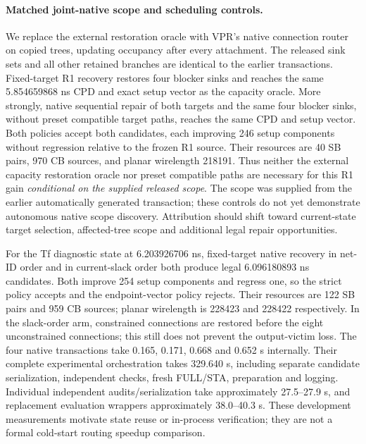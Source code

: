 \paragraph{Matched joint-native scope and scheduling controls.}
We replace the external restoration oracle with VPR's native connection router on copied trees, updating occupancy after every attachment. The released sink sets and all other retained branches are identical to the earlier transactions. Fixed-target R1 recovery restores four blocker sinks and reaches the same 5.854659868 ns CPD and exact setup vector as the capacity oracle. More strongly, native sequential repair of both targets and the same four blocker sinks, without preset compatible target paths, reaches the same CPD and setup vector. Both policies accept both candidates, each improving 246 setup components without regression relative to the frozen R1 source. Their resources are 40 SB pairs, 970 CB sources, and planar wirelength 218191. Thus neither the external capacity restoration oracle nor preset compatible paths are necessary for this R1 gain \emph{conditional on the supplied released scope}. The scope was supplied from the earlier automatically generated transaction; these controls do not yet demonstrate autonomous native scope discovery. Attribution should shift toward current-state target selection, affected-tree scope and additional legal repair opportunities.

For the Tf diagnostic state at 6.203926706 ns, fixed-target native recovery in net-ID order and in current-slack order both produce legal 6.096180893 ns candidates. Both improve 254 setup components and regress one, so the strict policy accepts and the endpoint-vector policy rejects. Their resources are 122 SB pairs and 959 CB sources; planar wirelength is 228423 and 228422 respectively. In the slack-order arm, constrained connections are restored before the eight unconstrained connections; this still does not prevent the output-victim loss. The four native transactions take 0.165, 0.171, 0.668 and 0.652 s internally. Their complete experimental orchestration takes 329.640 s, including separate candidate serialization, independent checks, fresh FULL/STA, preparation and logging. Individual independent audits/serialization take approximately 27.5--27.9 s, and replacement evaluation wrappers approximately 38.0--40.3 s. These development measurements motivate state reuse or in-process verification; they are not a formal cold-start routing speedup comparison.

